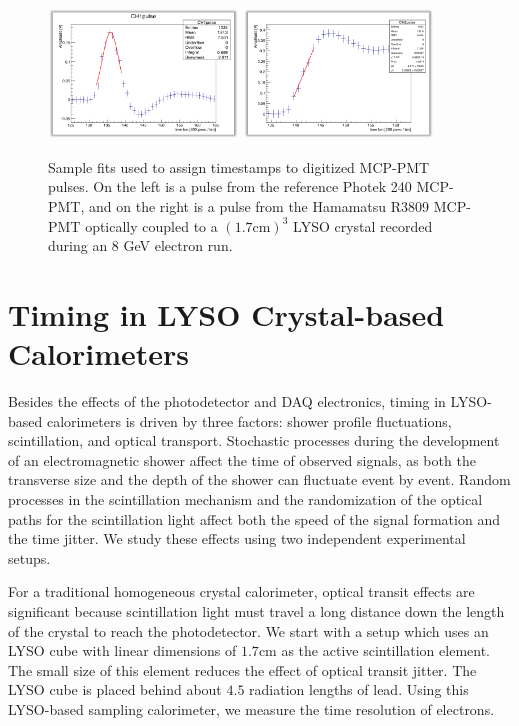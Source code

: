 \documentclass[12pt]{article}
\begin{document}
\begin{figure}[h] \centering
\includegraphics[width=0.45\textwidth]{figs/RefPulseFit} 
\includegraphics[width=0.45\textwidth]{figs/ScintPulseFit} 
\caption{Sample fits used to assign timestamps to digitized MCP-PMT pulses. 
On the left is a pulse from the reference Photek 240 MCP-PMT, and
on the right is a pulse from the Hamamatsu R3809 MCP-PMT
optically coupled to a $(1.7\mathrm{ cm})^3$  LYSO crystal
recorded during an 8 GeV electron run.}
\label{fig:PulseFits}
\end{figure}


\section{Timing in LYSO Crystal-based Calorimeters}

Besides the effects of the photodetector and DAQ electronics,
timing in LYSO-based calorimeters is driven by three factors:
shower profile fluctuations, scintillation, and optical transport. 
Stochastic processes during the development of an electromagnetic shower
affect the time of observed signals, as both the transverse
size and the depth of the shower can fluctuate event by event. 
Random processes in the scintillation mechanism and the 
randomization of the optical paths for the 
scintillation light affect both the speed of the signal formation
and the time jitter. We study these effects using
two independent experimental setups. 

For a traditional homogeneous crystal calorimeter, optical
transit effects are significant because scintillation light must
travel a long distance down the length of the crystal to reach
the photodetector. We start with a setup which uses an LYSO cube
with linear dimensions of $1.7\mathrm{cm}$ as the 
active scintillation element. The small size of this element reduces the effect of 
optical transit jitter. The LYSO cube is placed behind about $4.5$ 
radiation lengths of lead. Using this LYSO-based sampling calorimeter,
we measure the time resolution of electrons.
\end{document}
